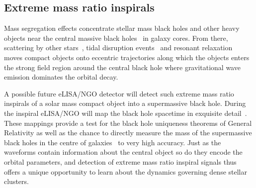 \documentclass[12pt]{article}
\newcommand{\lisa}{eLISA/NGO}
\begin{document}

\subsection{Extreme mass ratio inspirals}
Mass segregation
effects concentrate stellar mass black holes and other heavy objects  near the
central massive black holes~\cite{1997MNRAS.284..318S,2000ApJ...545..847M} in
galaxy cores. %
From there, scattering by
other stars~\cite{2007CQGra..24R.113A}, 
tidal disruption events~\cite{2005ApJ...631L.117M} and resonant
relaxation~\cite{2006ApJ...645L.133H} %
moves compact objects onto eccentric trajectories along which the objects
enters
the strong field region around the central black hole 
where gravitational wave emission dominates the orbital decay. 

A possible future \lisa{} detector will detect such extreme mass ratio
inspirals of a solar mass compact object into a supermassive black hole.
During the
inspiral \lisa{} will
map the black hole spacetime
in exquisite detail~\cite{AmaroSeoane:2012je}. 
These mappings provide a test for the
black hole uniqueness theorems of General Relativity as well as the chance to
directly measure the mass of the supermassive black holes in the
centre of galaxies~\cite{AmaroSeoane:2012je} to very high accuracy.
Just as the
waveforms contain information about the central object so do they encode the
orbital parameters, and detection of extreme mass ratio inspiral signals thus offers
a unique opportunity to learn about the dynamics governing dense stellar
clusters. 

\end{document}

